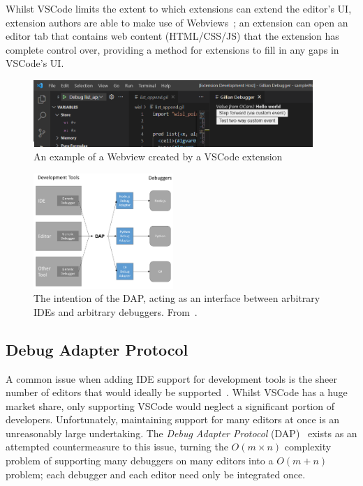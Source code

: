 Whilst VSCode limits the extent to which extensions can extend the editor's UI,
extension authors are able to make use of Webviews~\cite{vscode-webview}; an
extension can open an editor tab that contains web content (HTML/CSS/JS) that
the extension has complete control over, providing a method for extensions to
fill in any gaps in VSCode's UI.

\begin{figure}
  \center
  \includegraphics[width=400px]{img/webview-example.png}
  \caption{An example of a Webview created by a VSCode extension}
  \label{fig:webview-example}
\end{figure}


\begin{figure}
  \centering
  \vspace*{-1.6cm}
  \includegraphics[width=200px]{img/dap-diagram.png}
  \vspace*{-0.45cm}
  \caption{
    The intention of the DAP, acting as an interface between arbitrary IDEs and
    arbitrary debuggers. From~\cite{dap}.
  }
  \label{fig:dap-diagram}
  \vspace*{-1cm}
\end{figure}

\subsection{Debug Adapter Protocol}
A common issue when adding IDE support for development tools is the sheer
number of editors that would ideally be supported~\cite{magpiebridge}. Whilst
VSCode has a huge market share, only supporting VSCode would neglect a
significant portion of developers. Unfortunately, maintaining support for many
editors at once is an unreasonably large undertaking. The \textit{Debug Adapter
Protocol} (DAP)~\cite{dap} exists as an attempted countermeasure to this issue,
turning the $O(m \times n)$ complexity problem of supporting many debuggers on
many editors into a $O(m + n)$ problem; each debugger and each editor need only
be integrated once.

